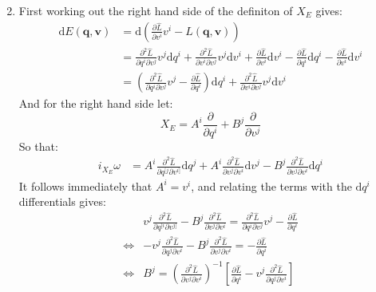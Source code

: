 \documentclass[12pt,a4]{article}
\newcommand{\e}{\mathrm{d}}
\begin{document}
\begin{enumerate}
\begin{equation*}
    \end{equation*}
  \item
    First working out the right hand side of the definiton of $X_E$ gives:
    \begin{align*}
      \e E(\mathbf{q}, \mathbf{v}) &= \e \left(\frac{\partial \hat L}{\partial v^i} v^i - L(\mathbf{q}, \mathbf{v})\right)\\
                                   &= \frac{\partial^2 \hat L}{\partial q^i\partial v^j} v^j \e q^i + \frac{\partial^2 \hat L}{\partial v^i\partial v^j} v^j \e v^i + \frac{\partial \hat L}{\partial v^i} \e v^i - \frac{\partial \hat L}{\partial q^i} \e q^i - \frac{\partial \hat L}{\partial v^i} \e v^i\\
                                   &= \left(\frac{\partial^2 \hat L}{\partial q^i\partial v^j} v^j - \frac{\partial \hat L}{\partial q^i} \right)\e q^i + \frac{\partial^2 \hat L}{\partial v^i\partial v^j} v^j \e v^i
    \end{align*}
    And for the right hand side let:
    \begin{equation*}
      X_E = A^i \frac{\partial}{\partial q^i} + B^j \frac{\partial}{\partial v^j}
    \end{equation*}
    So that:
    \begin{align*}
      i_{X_E}\omega  %
                    &= A^i \frac{\partial^2 \hat L}{\partial q^{[j} \partial v^{i]}} \e q^j  + A^i \frac{\partial^2 \hat L}{\partial v^j \partial v^i} \e v^j - B^j \frac{\partial^2 \hat L}{\partial v^j \partial v^i} \e q^i
    \end{align*}
    It follows immediately that $A^i = v^i$, and relating the terms with the $\e q^i$ differentials gives:
    \begin{align*}
                      & v^j \frac{\partial^2 \hat L}{\partial q^{[i} \partial v^{j]}} - B^j \frac{\partial^2 \hat L}{\partial v^j \partial v^i} = \frac{\partial^2 \hat L}{\partial q^i\partial v^j} v^j - \frac{\partial \hat L}{\partial q^i} \\
      \Leftrightarrow & - v^j \frac{\partial^2 \hat L}{\partial q^j \partial v^i} - B^j \frac{\partial^2 \hat L}{\partial v^j \partial v^i} = - \frac{\partial \hat L}{\partial q^i} \\
      \Leftrightarrow &  B^j  = \left(\frac{\partial^2 \hat L}{\partial v^j \partial v^i}\right)^{-1}\left[\frac{\partial \hat L}{\partial q^i} - v^j \frac{\partial^2 \hat L}{\partial q^j \partial v^i}\right] 

\end{align*}
\end{enumerate}
\end{document}
